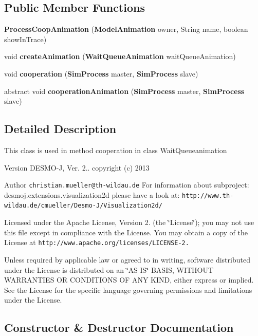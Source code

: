 \subsection*{Public Member Functions}
\begin{DoxyCompactItemize}
\item 
{\bf Process\-Coop\-Animation} ({\bf Model\-Animation} owner, String name, boolean show\-In\-Trace)
\item 
void {\bf create\-Animation} ({\bf Wait\-Queue\-Animation} wait\-Queue\-Animation)
\item 
void {\bf cooperation} ({\bf Sim\-Process} master, {\bf Sim\-Process} slave)
\item 
abstract void {\bf cooperation\-Animation} ({\bf Sim\-Process} master, {\bf Sim\-Process} slave)
\end{DoxyCompactItemize}


\subsection{Detailed Description}
This class is used in method cooperation in class Wait\-Queueanimation

\begin{DoxyVersion}{Version}
D\-E\-S\-M\-O-\/\-J, Ver. 2.. copyright (c) 2013 
\end{DoxyVersion}
\begin{DoxyAuthor}{Author}
{\tt christian.\-mueller@th-\/wildau.\-de} For information about subproject\-: desmoj.\-extensions.\-visualization2d please have a look at\-: {\tt http\-://www.\-th-\/wildau.\-de/cmueller/\-Desmo-\/\-J/\-Visualization2d/}
\end{DoxyAuthor}
Licensed under the Apache License, Version 2. (the \char`\"{}\-License\char`\"{}); you may not use this file except in compliance with the License. You may obtain a copy of the License at {\tt http\-://www.\-apache.\-org/licenses/\-L\-I\-C\-E\-N\-S\-E-\/2.}

Unless required by applicable law or agreed to in writing, software distributed under the License is distributed on an \char`\"{}\-A\-S I\-S\char`\"{} B\-A\-S\-I\-S, W\-I\-T\-H\-O\-U\-T W\-A\-R\-R\-A\-N\-T\-I\-E\-S O\-R C\-O\-N\-D\-I\-T\-I\-O\-N\-S O\-F A\-N\-Y K\-I\-N\-D, either express or implied. See the License for the specific language governing permissions and limitations under the License. 

\subsection{Constructor \& Destructor Documentation}
